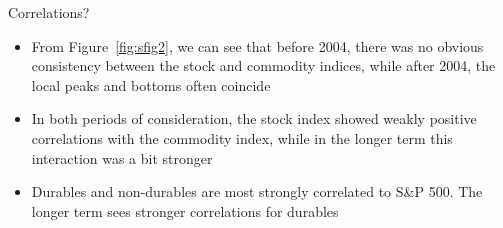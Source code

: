     \begin{frame}{Correlations?}
        \begin{itemize}
            \item<1-> From Figure~\ref{fig:sfig2}, we can see that before 2004, there was no obvious consistency between the stock and commodity indices, while after 2004, the local peaks and bottoms often coincide
            \item<2-> In both periods of consideration, the stock index showed weakly positive correlations with the commodity index, while in the longer term this interaction was a bit stronger
            \item<3-> Durables and non-durables are most strongly correlated to S\&P 500. The longer term sees stronger correlations for durables
        \end{itemize}
        

\end{frame}
